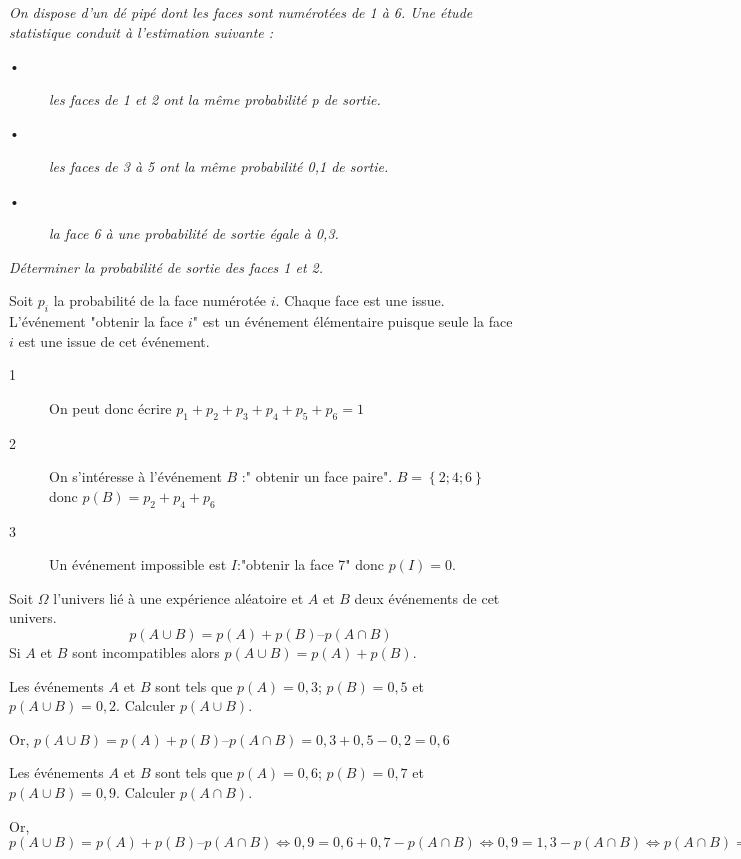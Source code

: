 \begin{Ex}

\textit{On dispose d'un dé pipé dont les faces sont numérotées de 1 à 6. Une étude statistique conduit à
l'estimation suivante :}
\begin{description}
\item[•]  \textit{les faces de 1 et 2 ont la même probabilité p de sortie.}
\item[•]  \textit{les faces de 3 à 5 ont la même probabilité 0,1 de sortie.}
\item[•]  \textit{la face 6 à une probabilité de sortie égale à 0,3.}
\end{description}
\textit{Déterminer la probabilité de sortie des faces 1 et 2.}

Soit $p_i$ la probabilité de la face numérotée $i$. Chaque face est une issue. L'événement "obtenir la face $i$" est un événement élémentaire puisque seule la face $i$ est une issue de cet événement.

\begin{description}
\item[1] On peut donc écrire $p_1+p_2+p_3+p_4+p_5+p_6=1$
\item[2] On s'intéresse à l'événement $B$ :" obtenir un face paire". $B=\left\lbrace 2 ; 4 ; 6 \right\rbrace $ donc $p(B)=p_2+p_4+p_6$
\item[3] Un événement impossible est $I$:"obtenir la face 7" donc $p(I)=0$.
\end{description}
\end{Ex}


\begin{Pp}
Soit $\Omega$ l'univers lié à une expérience aléatoire et $A$ et $B$ deux événements de cet univers.
$$p(A \cup B) = p(A) + p(B) – p(A \cap B)$$
Si $A$ et $B$ sont incompatibles alors $p(A \cup B) = p(A) + p(B)$.
\end{Pp}



\begin{Ex}

Les événements $A$ et $B$ sont tels que $p(A)=0,3$; $p(B)=0,5$ et $ p(A \cup B)=0,2$. Calculer $p(A \cup B)$.

Or, $p(A \cup B) = p(A) + p(B) – p(A \cap B) = 0,3 + 0,5 - 0,2 = 0,6$
\end{Ex}

\begin{Ex}

Les événements $A$ et $B$ sont tels que $p(A)=0,6$; $p(B)=0,7$ et $ p(A \cup B)=0,9$. Calculer $p(A \cap B)$.

Or, $p(A \cup B) = p(A) + p(B) – p(A \cap B) \Longleftrightarrow 0,9 = 0,6 + 0,7 - p(A \cap B) \Longleftrightarrow 0,9 = 1,3 - p(A \cap B) \Longleftrightarrow p(A \cap B)  = 1,3 - 0,9 = 0,4  $
\end{Ex}



